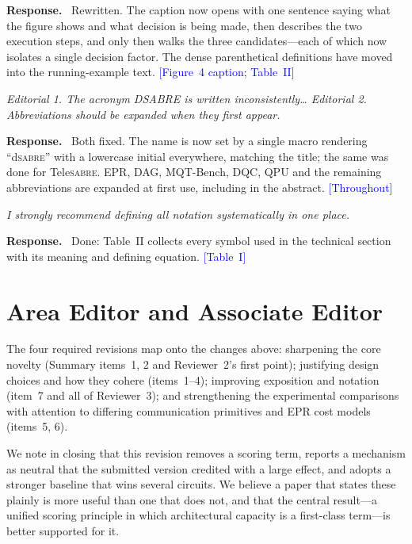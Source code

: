\documentclass[11pt]{article}
\newcommand{\dSABRE}{d\textsc{sabre}}
\newcommand{\TeleSABRE}{Tele\textsc{sabre}}
\newenvironment{comment}{\medskip\noindent\itshape}{\par}
\newcommand{\response}{\smallskip\noindent\textbf{Response.}\ }
\newcommand{\where}[1]{\textcolor{blue}{[#1]}}
\begin{document}
\response
Rewritten.  The caption now opens with one sentence saying what the
figure shows and what decision is being made, then describes the two
execution steps, and only then walks the three candidates---each of
which now isolates a single decision factor.  The dense parenthetical
definitions have moved into the running-example text.
\where{Figure~4 caption; Table~II}

\begin{comment}
Editorial 1. The acronym DSABRE is written inconsistently\ldots{}
Editorial 2. Abbreviations should be expanded when they first appear.
\end{comment}

\response
Both fixed.  The name is now set by a single macro rendering
``\dSABRE{}'' with a lowercase initial everywhere, matching the title;
the same was done for \TeleSABRE{}.  EPR, DAG, MQT-Bench, DQC, QPU and
the remaining abbreviations are expanded at first use, including in the
abstract.
\where{Throughout}

\begin{comment}
I strongly recommend defining all notation systematically in one place.
\end{comment}

\response
Done: Table~II collects every symbol used in the technical section with
its meaning and defining equation.
\where{Table~I}

\section*{Area Editor and Associate Editor}

The four required revisions map onto the changes above:
sharpening the core novelty (Summary items~1, 2 and Reviewer~2's first
point); justifying design choices and how they cohere (items~1--4);
improving exposition and notation (item~7 and all of Reviewer~3);
and strengthening the experimental comparisons with attention to
differing communication primitives and EPR cost models (items~5, 6).

We note in closing that this revision removes a scoring term, reports a
mechanism as neutral that the submitted version credited with a large
effect, and adopts a stronger baseline that wins several circuits.  We
believe a paper that states these plainly is more useful than one that
does not, and that the central result---a unified scoring principle in
which architectural capacity is a first-class term---is better
supported for it.
\end{document}
